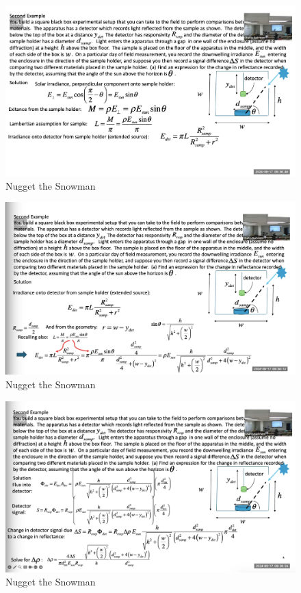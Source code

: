 \documentclass{article}
\begin{document}
\begin{figure}[h!]
\centering
\includegraphics[scale=.6]{Radiometry/Week4/Notes/Sept17/Second.png}
\caption{Nugget the Snowman}
\label{fig:Simple Extended Source}
\end{figure}



\begin{figure}[h!]
\centering
\includegraphics[scale=.6]{Radiometry/Week4/Notes/Sept17/Third.png}
\caption{Nugget the Snowman}
\label{fig:Second}
\end{figure}


\begin{figure}[h!]
\centering
\includegraphics[scale=.6]{Radiometry/Week4/Notes/Sept17/Fourth.png}
\caption{Nugget the Snowman}
\label{fig:Second}
\end{figure}
\end{document}

